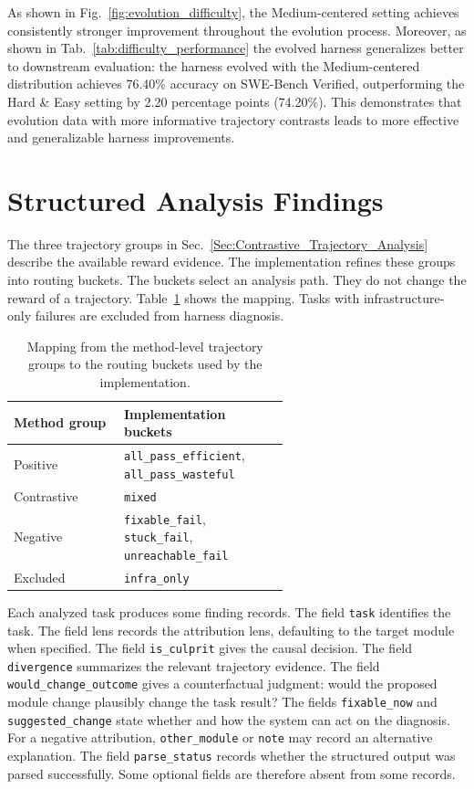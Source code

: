 \documentclass{article} %
\begin{document}
As shown in Fig.~\ref{fig:evolution_difficulty}, the Medium-centered setting achieves consistently stronger improvement throughout the evolution process. 
Moreover, as shown in Tab.~\ref{tab:difficulty_performance} the evolved harness generalizes better to downstream evaluation: the harness evolved with the Medium-centered distribution achieves 76.40\% accuracy on SWE-Bench Verified, outperforming the Hard \& Easy setting by 2.20 percentage points (74.20\%). This demonstrates that evolution data with more informative trajectory contrasts leads to more effective and generalizable harness improvements.


\section{Structured Analysis Findings}
\label{appendix:Analysis_Finding_Format}

The three trajectory groups in Sec.~\ref{Sec:Contrastive_Trajectory_Analysis}
describe the available reward evidence. The implementation refines these
groups into routing buckets. The buckets select an analysis path. They do not
change the reward of a trajectory. Table~\ref{tab:routing_mapping} shows the
mapping. Tasks with infrastructure-only failures are excluded from harness
diagnosis.

\begin{table}[h]
\centering
\small
\setlength{\tabcolsep}{4pt}
\renewcommand{\arraystretch}{1.12}
\caption{Mapping from the method-level trajectory groups to the routing buckets used by the implementation.}
\begin{tabular}{lp{0.60\linewidth}}
\toprule
\textbf{Method group} & \textbf{Implementation buckets} \\
\midrule
Positive & \texttt{all\_pass\_efficient}, \texttt{all\_pass\_wasteful} \\
Contrastive & \texttt{mixed} \\
Negative & \texttt{fixable\_fail}, \texttt{stuck\_fail}, \texttt{unreachable\_fail} \\
Excluded & \texttt{infra\_only} \\
\bottomrule
\end{tabular}
\label{tab:routing_mapping}
\end{table}

Each analyzed task produces some finding records. The field \texttt{task}
identifies the task. The field lens records the attribution lens, defaulting to the target module when specified. The field \texttt{is\_culprit} gives the causal decision.
The field \texttt{divergence} summarizes the relevant trajectory evidence.
The field \texttt{would\_change\_outcome} gives a counterfactual judgment:
would the proposed module change plausibly change the task result? The fields
\texttt{fixable\_now} and \texttt{suggested\_change} state whether and how the
system can act on the diagnosis. For a negative attribution,
\texttt{other\_module} or \texttt{note} may record an alternative explanation.
The field \texttt{parse\_status} records whether the structured output was
parsed successfully. Some optional fields are therefore absent from some
records.
\end{document}
